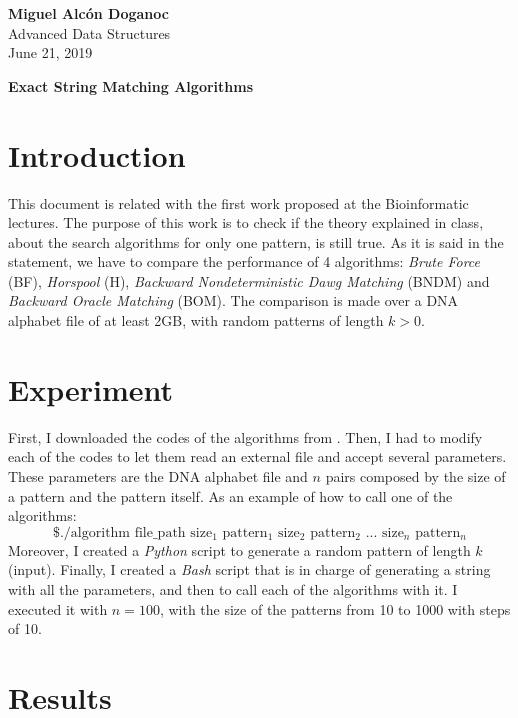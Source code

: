 \documentclass[a4paper, 10pt]{article}
\begin{document}
\noindent
\begin{flushright}
    \large\textbf{Miguel Alcón Doganoc} \\
    Advanced Data Structures \\
	June 21, 2019
\end{flushright}

\noindent
{\huge{\textbf{Exact String Matching Algorithms}}}

\section*{Introduction}
This document is related with the first work proposed at the Bioinformatic lectures. The purpose of this work is to check if the theory explained in class, about the search algorithms for only one pattern, is still true. As it is said in the statement, we have to compare the performance of 4 algorithms: \textit{Brute Force} (BF), \textit{Horspool} (H), \textit{Backward Nondeterministic Dawg Matching} (BNDM) and \textit{Backward Oracle Matching} (BOM). The comparison is made over a DNA alphabet file of at least 2GB, with random patterns of length $k > 0$.

\section*{Experiment}
First, I downloaded the codes of the algorithms from \cite{link}. Then, I had to modify each of the codes to let them read an external file and accept several parameters. These parameters are the DNA alphabet file and $n$ pairs composed by the size of a pattern and the pattern itself. As an example of how to call one of the algorithms:
\[
	\text{\$ ./algorithm file\_path size$_1$ pattern$_1$ size$_2$ pattern$_2$ ... size$_n$ pattern$_n$}
\]
Moreover, I created a \textit{Python} script to generate a random pattern of length $k$ (input). Finally, I created a \textit{Bash} script that is in charge of generating a string with all the parameters, and then to call each of the algorithms with it. I executed it with $n = 100$, with the size of the patterns from 10 to 1000 with steps of 10.

\section*{Results}




\end{document}
